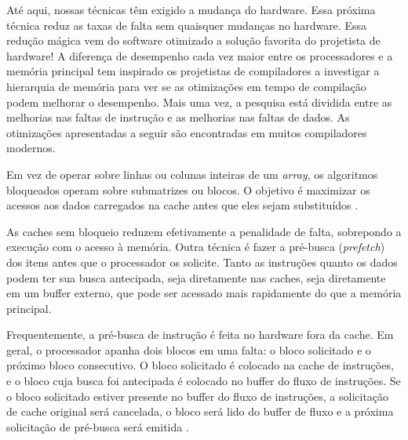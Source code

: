 Até aqui, nossas técnicas têm exigido a mudança do hardware. Essa próxima técnica reduz as taxas de falta sem quaisquer mudanças no hardware. Essa redução mágica vem do software otimizado a solução favorita do projetista de hardware! A diferença de desempenho cada vez maior entre os processadores e a memória principal tem inspirado os projetistas de compiladores a investigar a hierarquia de memória para ver se as otimizações em tempo de compilação podem melhorar o desempenho. Mais uma vez, a pesquisa está dividida entre as melhorias nas faltas de instrução e as melhorias nas faltas de dados. As otimizações apresentadas a seguir são encontradas em muitos compiladores modernos.

Em vez de operar sobre linhas ou colunas inteiras de um \textit{array}, os algoritmos bloqueados operam sobre submatrizes ou blocos. O objetivo é maximizar os acessos aos dados carregados na cache antes que eles sejam substituídos \cite{hennessy2019}.

As caches sem bloqueio reduzem efetivamente a penalidade de falta, sobrepondo a execução com o acesso à memória. Outra técnica é fazer a pré-busca (\textit{prefetch}) dos itens antes que o processador os solicite. Tanto as instruções quanto os dados podem ter sua busca antecipada, seja diretamente nas caches, seja diretamente em um buffer externo, que pode ser acessado mais rapidamente do que a memória principal.

Frequentemente, a pré-busca de instrução é feita no hardware fora da cache. Em geral, o processador apanha dois blocos em uma falta: o bloco solicitado e o próximo bloco consecutivo. O bloco solicitado é colocado na cache de instruções, e o bloco cuja busca foi antecipada é colocado no buffer do fluxo de instruções. Se o bloco solicitado estiver presente no buffer do fluxo de instruções, a solicitação de cache original será cancelada, o bloco será lido do buffer de fluxo e a próxima solicitação de pré-busca será emitida \cite{hennessy2019}.